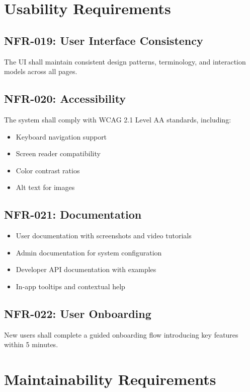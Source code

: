 \documentclass{report}
\begin{document}
\section{Usability Requirements}

\subsection{NFR-019: User Interface Consistency}
The UI shall maintain consistent design patterns, terminology, and interaction models across all pages.

\subsection{NFR-020: Accessibility}
The system shall comply with WCAG 2.1 Level AA standards, including:
\begin{itemize}
    \item Keyboard navigation support
    \item Screen reader compatibility
    \item Color contrast ratios
    \item Alt text for images
\end{itemize}

\subsection{NFR-021: Documentation}
\begin{itemize}
    \item User documentation with screenshots and video tutorials
    \item Admin documentation for system configuration
    \item Developer API documentation with examples
    \item In-app tooltips and contextual help
\end{itemize}

\subsection{NFR-022: User Onboarding}
New users shall complete a guided onboarding flow introducing key features within 5 minutes.

\section{Maintainability Requirements}
\end{document}
